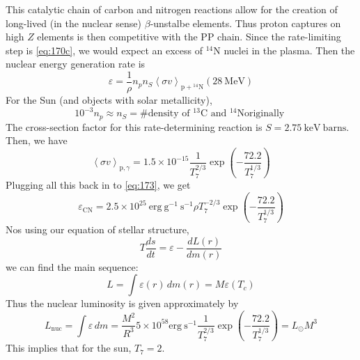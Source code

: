 \documentclass[10pt]{article}
\numberwithin{equation}{section}
\newcommand{\avg}[1]{\left\langle#1\right\rangle}
\begin{document}
  This catalytic chain of carbon and nitrogen reactions allow for
  the creation of long-lived (in the nuclear sense) $\beta$-unstalbe
  elements. Thus proton captures on high $Z$ elements is then
  competitive with the PP chain. Since the rate-limiting step is
  \eqref{eq:170c}, we would expect an excess of $\mathrm{{}^{14}N}$
    nuclei in the plasma. Then the nuclear energy generation rate is
    \begin{equation}
      \label{eq:173}
      \varepsilon = \frac{1}{\rho}n_pn_S\avg{\sigma
        v}_{\mathrm{p+{}^{14}N}}\left(28\ \mathrm{MeV}\right)
    \end{equation}
    For the Sun (and objects with solar metallicity),
    \begin{equation}
      \label{eq:174}
      10^{-3}n_p\approx n_S=\textrm{\# density of
      }\mathrm{{}^{13}C}\textrm{ and }\mathrm{{}^{14}N}\textrm{
        originally }
    \end{equation}
    The cross-section factor for this rate-determining reaction is
    $S=2.75\ \mathrm{keV\ barns}$. Then, we have
    \begin{equation}
      \label{eq:175}
      \avg{\sigma v}_{\mathrm{p},\gamma}=1.5\times 10^{-15}\frac{1}{T_7^{2/3}}\exp\left(-\frac{72.2}{T_7^{1/3}}\right)
    \end{equation}
    Plugging all this back in to \eqref{eq:173}, we get
    \begin{equation}
      \label{eq:176}
      \varepsilon_{\mathrm{CN}}=2.5\times 10^{25}\ \mathrm{erg\
        g^{-1}\ s^{-1}}\rho T_7^{-2/3}\exp\left(-\frac{72.2}{T_7^{1/3}}\right)
    \end{equation}
    Nos using our equation of stellar structure,
    \begin{equation}
      \label{eq:177}
      T\frac{ds}{dt}=\varepsilon-\frac{dL(r)}{dm(r)}
    \end{equation}
    we can find the main sequence:
    \begin{equation}
      \label{eq:178}
      L=\int \varepsilon(r)\,dm(r)=M\varepsilon(T_c)
    \end{equation}
    Thus the nuclear luminosity is given approximately by
    \begin{equation}
      \label{eq:179}
      L_{\mathrm{nuc}}=\int \varepsilon\, dm=\frac{M^2}{R^3}5\times
      10^{58}\mathrm{erg\
        s^{-1}}\frac{1}{T_7^{2/3}}\exp\left(-\frac{72.2}{T_7^{1/3}}\right)=L_\odot M^3
    \end{equation}
    This implies that for the sun, $T_7=2$.
\end{document}
